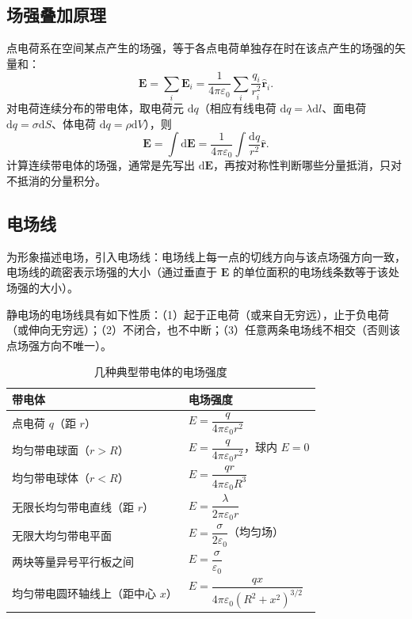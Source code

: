     \subsection{场强叠加原理}
    点电荷系在空间某点产生的场强，等于各点电荷单独存在时在该点产生的场强的矢量和：
    \[
    \boldsymbol{E}=\sum_i\boldsymbol{E}_i=\frac{1}{4\pi\varepsilon_0}\sum_i\frac{q_i}{r_i^{2}}\hat{\boldsymbol{r}}_i.
    \]
    对电荷连续分布的带电体，取电荷元 $\mathrm{d}q$（相应有线电荷 $\mathrm{d}q=\lambda\mathrm{d}l$、面电荷 $\mathrm{d}q=\sigma\mathrm{d}S$、体电荷 $\mathrm{d}q=\rho\mathrm{d}V$），则
    \[
    \boldsymbol{E}=\int\mathrm{d}\boldsymbol{E}=\frac{1}{4\pi\varepsilon_0}\int\frac{\mathrm{d}q}{r^{2}}\hat{\boldsymbol{r}}.
    \]
    计算连续带电体的场强，通常是先写出 $\mathrm{d}\boldsymbol{E}$，再按对称性判断哪些分量抵消，只对不抵消的分量积分。

    \subsection{电场线}
    为形象描述电场，引入电场线：电场线上每一点的切线方向与该点场强方向一致，电场线的疏密表示场强的大小（通过垂直于 $\boldsymbol{E}$ 的单位面积的电场线条数等于该处场强的大小）。

    静电场的电场线具有如下性质：（1）起于正电荷（或来自无穷远），止于负电荷（或伸向无穷远）；（2）不闭合，也不中断；（3）任意两条电场线不相交（否则该点场强方向不唯一）。

    \begin{table}[htbp]
    \centering
    \caption{几种典型带电体的电场强度}
    \begin{tabular}{ll}
    \toprule
    带电体 & 电场强度 \\
    \midrule
    点电荷 $q$（距 $r$） & $E=\dfrac{q}{4\pi\varepsilon_0r^{2}}$ \\
    均匀带电球面（$r>R$） & $E=\dfrac{q}{4\pi\varepsilon_0r^{2}}$，球内 $E=0$ \\
    均匀带电球体（$r<R$） & $E=\dfrac{qr}{4\pi\varepsilon_0R^{3}}$ \\
    无限长均匀带电直线（距 $r$） & $E=\dfrac{\lambda}{2\pi\varepsilon_0r}$ \\
    无限大均匀带电平面 & $E=\dfrac{\sigma}{2\varepsilon_0}$（均匀场） \\
    两块等量异号平行板之间 & $E=\dfrac{\sigma}{\varepsilon_0}$ \\
    均匀带电圆环轴线上（距中心 $x$） & $E=\dfrac{qx}{4\pi\varepsilon_0(R^{2}+x^{2})^{3/2}}$ \\
    \bottomrule
    \end{tabular}
    \end{table}

